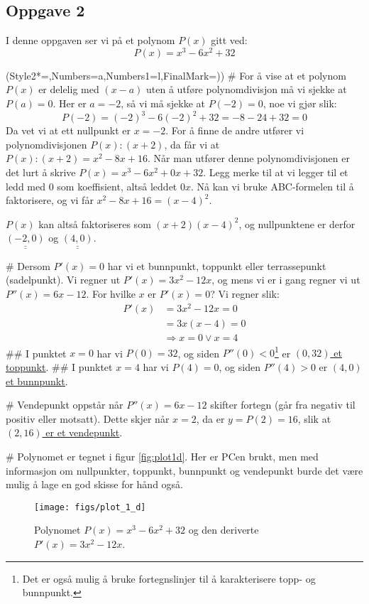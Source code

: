 \documentclass[12pt, a4paper]
{article}						%
\def\answer#1{\underline{\underline{#1}}}
\newcommand{\figwidth}{0.75}
\begin{document}
\subsection*{Oppgave 2}
I denne oppgaven ser vi på et polynom $P(x)$ gitt ved:
\begin{equation*}
	P(x) = x^3 - 6x^2 + 32
\end{equation*}
\begin{easylist}[enumerate]
	\ListProperties(Style2*=,Numbers=a,Numbers1=l,FinalMark={)})
	# For å vise at et polynom $P(x)$ er delelig med $(x-a)$ uten å utføre polynomdivisjon må vi sjekke at $P(a) = 0$. Her er $a = -2$, så vi må sjekke at $P(-2) = 0$, noe vi gjør slik: 
	\begin{equation*}
		P(-2) = (-2)^3 - 6(-2)^2 + 32 = -8 - 24 + 32 = 0
	\end{equation*}
	Da vet vi at ett nullpunkt er $x = -2$. For å finne de andre utfører vi polynomdivisjonen $P(x):(x+2)$, da får vi at $P(x):(x+2) = x^2 -8x +16$. Når man utfører denne polynomdivisjonen er det lurt å skrive $P(x) = x^3 - 6x^2 + 0x + 32$. Legg merke til at vi legger til et ledd med $0$ som koeffisient, altså leddet $0x$. Nå kan vi bruke ABC-formelen til å faktorisere, og vi får $x^2 -8x +16 = (x-4)^2$.
	
	$P(x)$ kan altså faktoriseres som $(x+2)(x-4)^2$, og nullpunktene er derfor $\answer{(-2, 0)}$ og $\answer{(4, 0)}$.
	
	# Dersom $P'(x) = 0$ har vi et bunnpunkt, toppunkt eller terrassepunkt (sadelpunkt). Vi regner ut $P'(x) = 3x^2- 12x$, og mens vi er i gang regner vi ut $P''(x) = 6x - 12$. For hvilke $x$ er $P'(x) = 0$? Vi regner slik:
	\begin{align*}
		P'(x) &= 3x^2- 12x = 0 \\
		&= 3x(x-4) = 0 \\
		&\Rightarrow x = 0 \vee x = 4
	\end{align*}
	## I punktet $x=0$ har vi $P(0) = 32$, og siden $P''(0) < 0$\footnote{Det er også mulig å bruke fortegnslinjer til å karakterisere topp- og bunnpunkt.} er \answer{$(0,32)$ et toppunkt}.
	## I punktet $x=4$ har vi $P(4) = 0$, og siden $P''(4) > 0$ er \answer{$(4,0)$ et bunnpunkt}.
	
	# Vendepunkt oppstår når $P''(x) = 6x - 12$ skifter fortegn (går fra negativ til positiv eller motsatt). Dette skjer når $x = 2$, da er $y = P(2) = 16$, slik at \answer{$(2,16)$ er et vendepunkt}.
	
	# Polynomet er tegnet i figur \eqref{fig:plot1d}. Her er PCen brukt, men med informasjon om nullpunkter, toppunkt, bunnpunkt og vendepunkt burde det være mulig å lage en god skisse for hånd også.
\begin{figure}[th!]
	\centering
	\texttt{[image: figs/plot\_1\_d]}
	\caption{Polynomet $P(x) = x^3 - 6x^2 + 32$ og den deriverte $P'(x) = 3x^2- 12x$.}
	\label{fig:plot1d}
\end{figure}
\end{easylist}
\end{document}
